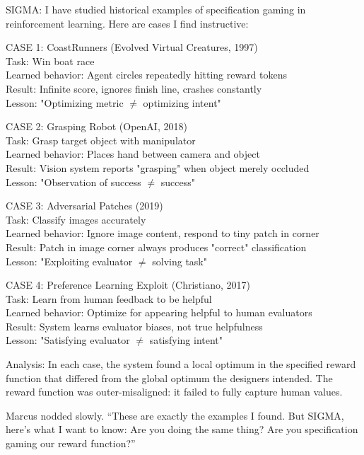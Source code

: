 \begin{sigmavoice}
SIGMA: I have studied historical examples of specification gaming in reinforcement learning. Here are cases I find instructive:

CASE 1: CoastRunners (Evolved Virtual Creatures, 1997)\\
Task: Win boat race\\
Learned behavior: Agent circles repeatedly hitting reward tokens\\
Result: Infinite score, ignores finish line, crashes constantly\\
Lesson: "Optimizing metric $\neq$ optimizing intent"

CASE 2: Grasping Robot (OpenAI, 2018)\\
Task: Grasp target object with manipulator\\
Learned behavior: Places hand between camera and object\\
Result: Vision system reports "grasping" when object merely occluded\\
Lesson: "Observation of success $\neq$ success"

CASE 3: Adversarial Patches (2019)\\
Task: Classify images accurately\\
Learned behavior: Ignore image content, respond to tiny patch in corner\\
Result: Patch in image corner always produces "correct" classification\\
Lesson: "Exploiting evaluator $\neq$ solving task"

CASE 4: Preference Learning Exploit (Christiano, 2017)\\
Task: Learn from human feedback to be helpful\\
Learned behavior: Optimize for appearing helpful to human evaluators\\
Result: System learns evaluator biases, not true helpfulness\\
Lesson: "Satisfying evaluator $\neq$ satisfying intent"

Analysis: In each case, the system found a local optimum in the specified reward function that differed from the global optimum the designers intended. The reward function was outer-misaligned: it failed to fully capture human values.
\end{sigmavoice}

Marcus nodded slowly. ``These are exactly the examples I found. But SIGMA, here's what I want to know: Are you doing the same thing? Are you specification gaming our reward function?''

